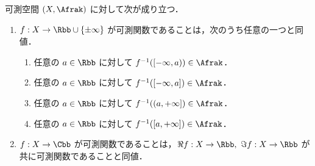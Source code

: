 \begin{proposition}\label{prop:measurable_function_characterization}
    可測空間 $(X,\Afrak)$ に対して次が成り立つ．
    \begin{enumerate}
        \item $f:X\to\Rbb\cup\{\pm\infty\}$ が可測関数であることは，次のうち任意の一つと同値．
            \begin{enumerate}
                \item 任意の $a\in\Rbb$ に対して $f^{-1}([-\infty,a))\in\Afrak$．
                \item 任意の $a\in\Rbb$ に対して $f^{-1}([-\infty,a])\in\Afrak$．
                \item 任意の $a\in\Rbb$ に対して $f^{-1}((a,+\infty])\in\Afrak$．
                \item 任意の $a\in\Rbb$ に対して $f^{-1}([a,+\infty])\in\Afrak$．
            \end{enumerate}
        \item $f:X\to\Cbb$ が可測関数であることは，$\Re f:X\to\Rbb,\ \Im f:X\to\Rbb$ が共に可測関数であることと同値．
    \end{enumerate}
\end{proposition}

